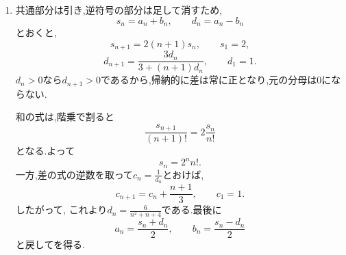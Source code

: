 \begin{enumerate}[label=\textbf{問\arabic*.},leftmargin=3.8em,format=\bookitemlink{practice-advanced}{solution}{problem}]
    \noindent \textbf{【別解】}\\
    逆数の式で,平行移動せず直接両辺に$n+1$を掛けてもよい.
    \[
      (n+1)c_{n+1}-nc_n=1.
    \]
    したがって$e_n=nc_n$は公差$1$のであり, $e_1=\frac{1}{2}$から
    \[
      e_n=n-\frac12,\qquad c_n=1-\frac1{2n}
    \]
    となる.を引く方法と,添字を掛けてを一定にする方法の両方が使える.
  \item 共通部分は引き,逆符号の部分は足して消すため,
    \[
      s_n=a_n+b_n,\qquad d_n=a_n-b_n
    \]
    とおくと,
    \[
      s_{n+1}=2(n+1)s_n,\qquad s_1=2,
    \]
    \[
      d_{n+1}
      =\frac{3d_n}{3+(n+1)d_n},\qquad d_1=1.
    \]
    $d_n>0$なら$d_{n+1}>0$であるから,帰納的に差は常に正となり,元の分母は$0$にならない.

    和の式は,階乗で割ると
    \[
      \frac{s_{n+1}}{(n+1)!}=2\frac{s_n}{n!}
    \]
    となる.よって
    \[
      s_n=2^n n!.
    \]
    一方,差の式の逆数を取って$c_n=\frac{1}{d_n}$とおけば,
    \[
      c_{n+1}=c_n+\frac{n+1}{3},\qquad c_1=1.
    \]
    したがって,
    これより$d_n=\frac{6}{n^2+n+4}$である.最後に
    \[
      a_n=\frac{s_n+d_n}{2},\qquad
      b_n=\frac{s_n-d_n}{2}
    \]
    と戻してを得る.


\end{enumerate}
